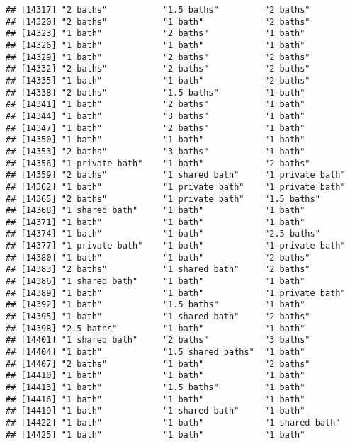 \documentclass[
]{article}
\begin{document}
\begin{verbatim}
## [14317] "2 baths"           "1.5 baths"         "2 baths"          
## [14320] "2 baths"           "1 bath"            "2 baths"          
## [14323] "1 bath"            "2 baths"           "1 bath"           
## [14326] "1 bath"            "1 bath"            "1 bath"           
## [14329] "1 bath"            "2 baths"           "2 baths"          
## [14332] "2 baths"           "2 baths"           "2 baths"          
## [14335] "1 bath"            "1 bath"            "2 baths"          
## [14338] "2 baths"           "1.5 baths"         "1 bath"           
## [14341] "1 bath"            "2 baths"           "1 bath"           
## [14344] "1 bath"            "3 baths"           "1 bath"           
## [14347] "1 bath"            "2 baths"           "1 bath"           
## [14350] "1 bath"            "1 bath"            "1 bath"           
## [14353] "2 baths"           "3 baths"           "1 bath"           
## [14356] "1 private bath"    "1 bath"            "2 baths"          
## [14359] "2 baths"           "1 shared bath"     "1 private bath"   
## [14362] "1 bath"            "1 private bath"    "1 private bath"   
## [14365] "2 baths"           "1 private bath"    "1.5 baths"        
## [14368] "1 shared bath"     "1 bath"            "1 bath"           
## [14371] "1 bath"            "1 bath"            "1 bath"           
## [14374] "1 bath"            "1 bath"            "2.5 baths"        
## [14377] "1 private bath"    "1 bath"            "1 private bath"   
## [14380] "1 bath"            "1 bath"            "2 baths"          
## [14383] "2 baths"           "1 shared bath"     "2 baths"          
## [14386] "1 shared bath"     "1 bath"            "1 bath"           
## [14389] "1 bath"            "1 bath"            "1 private bath"   
## [14392] "1 bath"            "1.5 baths"         "1 bath"           
## [14395] "1 bath"            "1 shared bath"     "2 baths"          
## [14398] "2.5 baths"         "1 bath"            "1 bath"           
## [14401] "1 shared bath"     "2 baths"           "3 baths"          
## [14404] "1 bath"            "1.5 shared baths"  "1 bath"           
## [14407] "2 baths"           "1 bath"            "2 baths"          
## [14410] "1 bath"            "1 bath"            "1 bath"           
## [14413] "1 bath"            "1.5 baths"         "1 bath"           
## [14416] "1 bath"            "1 bath"            "1 bath"           
## [14419] "1 bath"            "1 shared bath"     "1 bath"           
## [14422] "1 bath"            "1 bath"            "1 shared bath"    
## [14425] "1 bath"            "1 bath"            "1 bath"           

\end{verbatim}
\end{document}
